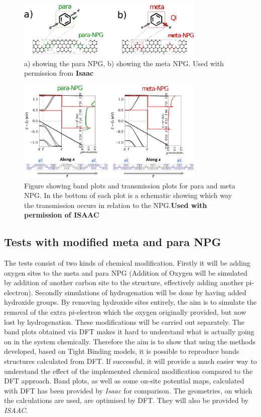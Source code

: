 \begin{figure}[ht]
    \centering
    \includegraphics[width=0.8\textwidth]{Figures/Metaparagraphic.eps}
    \caption{a) showing the para NPG, b) showing the meta NPG. Used with permission from \textbf{Isaac}}
    \label{Metaparastructfig}
\end{figure}
\begin{figure}[ht]
	\centering
	\includegraphics[width=0.8\textwidth]{Figures/metapararesultdraft.eps}
	\caption{Figure showing band plots and transmission plots for para and meta NPG. In the bottom of each plot is a schematic showing which way the transmission occurs in relation to the NPG.\textbf{Used with permission of ISAAC}}
	\label{metapara}
\end{figure}
\newpage
\subsection{Tests with modified meta and para NPG}\label{test1}
The tests consist of two kinds of chemical modification. Firstly it will be adding oxygen sites to the meta and para NPG (Addition of Oxygen will be simulated by addition of another carbon site to the structure, effectively adding another pi-electron). Secondly simulations of hydrogenation will be done by having added hydroxide groups. By removing hydroxide sites entirely, the aim is to simulate the removal of the extra pi-electron which the oxygen originally provided, but now lost by hydrogenation. These modifications will be carried out separately. The band plots obtained via DFT makes it hard to understand what is actually going on in the system chemically. Therefore the aim is to show that using the methods developed, based on Tight Binding models, it is possible to reproduce bands structures calculated from DFT. If successful, it will provide a much easier way to understand the effect of the implemented chemical modification compared to the DFT approach. Band plots, as well as some on-site potential maps, calculated with DFT has been provided by \textit{Isaac} for comparison. The geometries, on which the calculations are used, are optimised by DFT. They will also be provided by \textit{ISAAC}.
